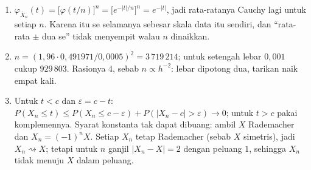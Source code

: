 \begin{enumerate}[label=\textbf{19.\arabic*}]
  \item $\varphi_{\bar X_{n}}(t)=\bigl[\varphi(t/n)\bigr]^{n}
        =\bigl[e^{-|t|/n}\bigr]^{n}=e^{-|t|}$, jadi rata-ratanya Cauchy lagi untuk
        setiap $n$. Karena itu se selamanya sebesar skala data itu sendiri, dan
        ``rata-rata $\pm$ dua se'' tidak menyempit walau $n$ dinaikkan.

  \item $n=(1{,}96\cdot0{,}491971/0{,}0005)^{2}=3\,719\,214$; untuk setengah lebar
        $0{,}001$ cukup $929\,803$. Rasionya $4$, sebab $n\propto h^{-2}$: lebar
        dipotong dua, tarikan naik empat kali.

  \item Untuk $t<c$ dan $\varepsilon=c-t$:
        $P(X_{n}\le t)\le P(X_{n}\le c-\varepsilon)+P(|X_{n}-c|>\varepsilon)\to0$;
        untuk $t>c$ pakai komplemennya. Syarat konstanta tak dapat dibuang:
        ambil $X$ Rademacher dan $X_{n}=(-1)^{n}X$. Setiap $X_{n}$ tetap
        Rademacher (sebab $X$ simetris), jadi $X_{n}\rightsquigarrow X$; tetapi
        untuk $n$ ganjil $|X_{n}-X|=2$ dengan peluang $1$, sehingga $X_{n}$ tidak
        menuju $X$ dalam peluang.
\end{enumerate}

